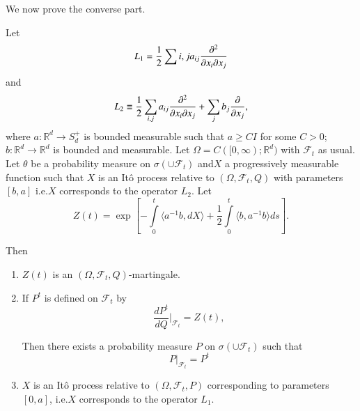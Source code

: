 We now prove the converse part.

\begin{theorem*}
Let
$$
L_{1}=\frac{1}{2}\sum\limits{i,j}a_{ij}\frac{\partial^{2}}{\partial x_{i}\partial x_{j}}
$$
and 
$$
L_{2}\equiv \frac{1}{2}\sum\limits_{i,j}a_{ij}\frac{\partial^{2}}{\partial x_{i}\partial
  x_{j}}+\sum_{j}b_{j}\frac{\partial}{\partial x_{j}},
$$
where $a:\mathbb{R}^{d}\to S^{+}_{d}$ is bounded measurable such that
$a\geq CI$ for some $C>0$; $b:\mathbb{R}^{d}\to \mathbb{R}^{d}$ is
bounded and measurable. Let $\Omega=C([0,\infty);\mathbb{R}^{d})$ with
  $\mathscr{F}_{t}$ as usual. Let $\theta$ be a probability measure on
  $\sigma(\cup \mathscr{F}_{t})$ and\pageoriginale $X$ a progressively
  measurable function such that $X$ is an It\^o process relative to
  $(\Omega,\mathscr{F}_{t},Q)$ with parameters $[b,a]$ i.e.\@ $X$
  corresponds to the operator $L_{2}$. Let 
$$
Z(t)=\exp [-\int\limits^{t}_{0}\langle a^{-1}b,dX\rangle
  +\frac{1}{2}\int\limits^{t}_{0}\langle b,a^{-1}b\rangle ds].
$$

Then
\begin{enumerate}
\renewcommand{\theenumi}{\roman{enumi}}
\renewcommand{\labelenumi}{\rm(\theenumi)}
\item $Z(t)$ is an $(\Omega,\mathscr{F}_{t},Q)$-martingale.

\item If $P^{t}$ is defined on $\mathscr{F}_{t}$ by
$$
\frac{dP^{t}}{dQ}\Big|_{\mathscr{F}_{t}}=Z(t),
$$

Then there exists a probability measure $P$ on $\sigma(\cup
\mathscr{F}_{t})$ such that 
$$
P\Big|_{\mathscr{F}_{t}}=P^{t}
$$

\item $X$ is an It\^o process relative to $(\Omega,
  \mathscr{F}_{t},P)$ corresponding to parameters $[0,a]$, i.e.\@ $X$
  corresponds to the operator $L_{1}$.
\end{enumerate}
\end{theorem*}

